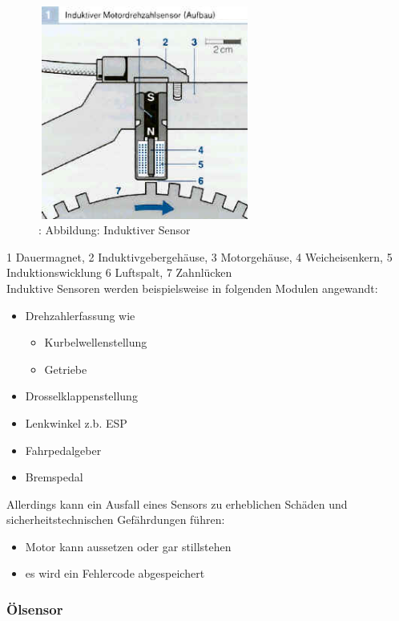 			\begin{figure}
				\centering
				\includegraphics[width=7cm, height=7cm] {aufbau_induktiv.png}
				\caption{\cite{TS_ind_funkt_pic}: Abbildung: Induktiver Sensor}
			\end{figure}

			1 Dauermagnet, 2 Induktivgebergehäuse, 3 Motorgehäuse, 4 Weicheisenkern, 5 Induktionswicklung 6 Luftspalt, 7 Zahnlücken\\
			Induktive Sensoren werden beispielsweise in folgenden Modulen angewandt:
			
			\begin{itemize}
				\item Drehzahlerfassung wie
					\begin{itemize}
						\item Kurbelwellenstellung
						\item Getriebe
					\end{itemize}	
				\item Drosselklappenstellung
				\item Lenkwinkel z.b. ESP
				\item Fahrpedalgeber
				\item Bremspedal
			\end{itemize}
		
			Allerdings kann ein Ausfall eines Sensors zu erheblichen Schäden und sicherheitstechnischen Gefährdungen führen:
			\begin{itemize}
				\item Motor kann aussetzen oder gar stillstehen
				\item es wird ein Fehlercode abgespeichert
			\end{itemize}				
		
			\subsubsection{Ölsensor}
					
